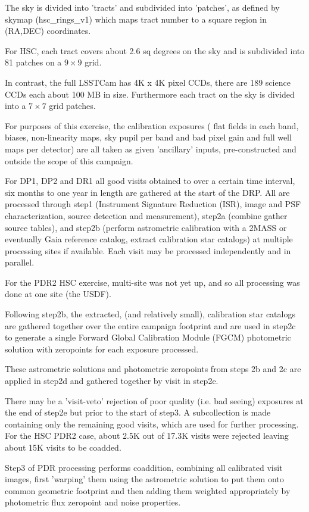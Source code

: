 The sky is divided into 'tracts' and subdivided into 'patches',
as defined by skymap (hsc\_rings\_v1) which maps tract number to a
square region in (RA,DEC) coordinates.

For HSC, each tract covers about 2.6 sq degrees on the sky and is
subdivided into 81 patches on a $9 \times 9$ grid.


In contrast, the full LSSTCam has 4K x 4K pixel CCDs, there are 
189 science CCDs each about 100 MB in size.  Furthermore each tract 
on the sky is divided into a $7\times 7$ grid patches.

For purposes of this exercise, the calibration exposures (
flat fields in each band, biases, non-linearity maps, sky pupil per 
band and bad pixel gain and full well maps per detector) are all
taken as given 'ancillary' inputs, pre-constructed and outside the
scope of this campaign.

For DP1, DP2 and DR1 all good visits obtained to over a certain time
interval, six months to one year in length are gathered at the
start of the DRP.  All are processed through step1 (Instrument Signature
Reduction (ISR), image and PSF characterization, source detection and 
measurement), step2a (combine gather source tables), and step2b (perform 
astrometric calibration with a 2MASS or eventually Gaia reference catalog,
extract calibration star catalogs) 
at multiple processing sites if available.  Each visit may be processed
independently and in parallel.

For the PDR2 HSC exercise, multi-site was not yet up, and so all processing
was done at one site (the USDF).

Following step2b, the extracted, (and relatively small),
calibration star catalogs are gathered together over the entire campaign
footprint and are used in step2c to generate a single Forward 
Global Calibration Module (FGCM) photometric solution with zeropoints for
each exposure processed.

These astrometric solutions and photometric zeropoints from steps 2b and 2c
are applied in step2d and gathered together by visit in step2e.

There may be a 'visit-veto' rejection of poor quality (i.e. bad seeing)
exposures at the end of step2e but prior to the start of step3.  A subcollection is made containing only the remaining good visits, which are used for
further processing.  For the HSC PDR2 case, about 2.5K out of 17.3K visits
were rejected leaving about 15K visits to be coadded.

Step3 of PDR processing performs coaddition, combining all calibrated 
visit images, first 'warping' them using the astrometric solution to put 
them onto common geometric footprint and then adding them weighted appropriately
by photometric flux zeropoint and noise properties.

